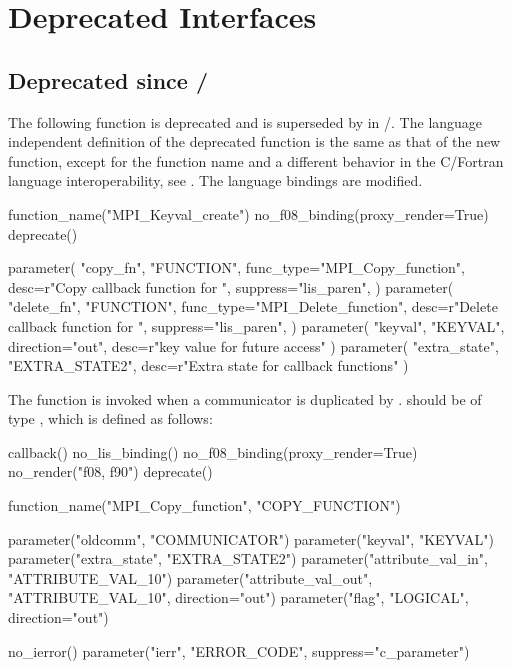\chapter{Deprecated Interfaces}
\label{chap:deprecated}
 
\section{Deprecated since \texorpdfstring{\mpiiidoto/}{MPI-2.0}} 
\label{sec:deprecated:since20}

The following function is deprecated and is superseded by  in \mpiiidoto/. 
The language independent definition 
of the deprecated function is the same as that of the new function,
  except for the function name and a different behavior in the
  C/Fortran language interoperability, see .
The language bindings are modified.

\begin{mpi-binding}
    function_name("MPI_Keyval_create")
    no_f08_binding(proxy_render=True)
    deprecate()
    
    parameter(
        "copy_fn",
        "FUNCTION",
        func_type="MPI_Copy_function",
        desc=r"Copy callback function for ",
        suppress="lis_paren",
    )
    parameter(
        "delete_fn",
        "FUNCTION",
        func_type="MPI_Delete_function",
        desc=r"Delete callback function for ",
        suppress="lis_paren",
    )
    parameter(
        "keyval", "KEYVAL", direction="out", desc=r"key value for future access"
    )
    parameter(
        "extra_state", "EXTRA_STATE2", desc=r"Extra state for callback functions"
    )
\end{mpi-binding}


The  function is invoked when a communicator is
duplicated by .   should be
of type , which is defined as follows:


\begin{mpi-binding}
    callback()
    no_lis_binding()
    no_f08_binding(proxy_render=True)
    no_render("f08, f90")
    deprecate()
    
    function_name("MPI_Copy_function", "COPY_FUNCTION")
    
    parameter("oldcomm", "COMMUNICATOR")
    parameter("keyval", "KEYVAL")
    parameter("extra_state", "EXTRA_STATE2")
    parameter("attribute_val_in", "ATTRIBUTE_VAL_10")
    parameter("attribute_val_out", "ATTRIBUTE_VAL_10", direction="out")
    parameter("flag", "LOGICAL", direction="out")
    
    no_ierror()
    parameter("ierr", "ERROR_CODE", suppress="c_parameter")
\end{mpi-binding}

